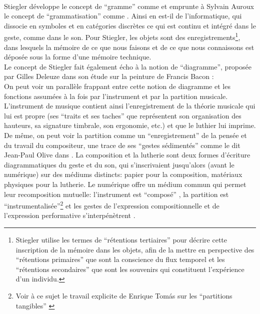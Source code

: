 \\
\indent Stiegler développe le concept de ``gramme'' comme  et emprunte à Sylvain Auroux \cite{auroux_revolution_1994} le concept de ``grammatisation'' comme . Ainsi en est-il de l'informatique, qui dissocie en symboles et en catégories discrètes ce qui est continu et intégré dans le geste, comme dans le son. Pour Stiegler, les objets sont des enregistrements\footnote{Stiegler utilise les termes de ``rétentions tertiaires'' pour décrire cette inscription de la mémoire dans les objets, afin de la mettre en perspective des ``rétentions primaires'' que sont la conscience du flux temporel et les ``rétentions secondaires'' que sont les souvenirs qui constituent l'expérience d'un individu.}, dans lesquels la mémoire de ce que nous faisons et de ce que nous connaissons est déposée sous la forme d'une mémoire technique.\\
\indent Le concept de Stiegler fait également écho à la notion de ``diagramme'', proposée par Gilles Deleuze dans son étude sur la peinture de Francis Bacon \cite{deleuze_francis_1981} : \\
\indent On peut voir un parallèle frappant entre cette notion de diagramme et les fonctions assumées à la fois par l'instrument et par la partition musicale. L'instrument de musique contient ainsi l'enregistrement de la théorie musicale qui lui est propre (ses ``traits et ses taches'' que représentent son organisation des hauteurs, sa signature timbrale, son ergonomie, etc.) et que le luthier lui imprime. De même, on peut voir la partition comme un ``enregistrement'' de la pensée et du travail du compositeur, une trace de ses ``gestes sédimentés'' comme le dit Jean-Paul Olive dans \cite{olive_expression_2013}. La composition et la lutherie sont deux formes d’écriture diagrammatiques du geste et du son, qui s’inscrivaient jusqu’alors (avant le numérique) sur des médiums distincts: papier pour la composition, matériaux physiques pour la lutherie. Le numérique offre un médium commun qui permet leur recomposition mutuelle: l'instrument est ``composé'' \cite{schnell_introducing_2002}, la partition est ``instrumentalisée''\footnote{Voir à ce sujet le travail explicite de Enrique Tomás sur les ``partitions tangibles'' \cite{tomas_tangible_2014}} et les gestes de l'expression compositionnelle et de l'expression performative s'interpénètrent \cite{dobrian_e_2006}.\\
